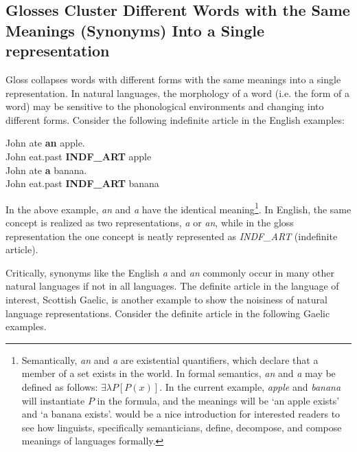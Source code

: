 \documentclass[final]{ua-thesis}
\numberwithin{equation}{section}
\begin{document}
\subsection{Glosses Cluster Different Words with the Same Meanings (Synonyms) Into a Single representation}\label{sec:cluster}
Gloss collapses words with different forms with the same meanings into a single representation. In natural languages, the morphology of a word (i.e. the form of a word) may be sensitive to the phonological environments and changing into different forms. Consider the following indefinite article in the English examples: 

\begin{exe}  
\ex \gll John ate \textbf{an} apple.\\
	John eat.past	\textbf{INDF\_ART} apple\\
\ex \gll John ate \textbf{a} banana.\\
	John eat.past   \textbf{INDF\_ART} banana\\
\end{exe}

In the above example, \textit{an} and \textit{a} have the identical meaning\footnote{Semantically, \textit{an} and \textit{a} are existential quantifiers, which declare that a member of a set exists in the world. In formal semantics, \textit{an} and \textit{a} may be defined as follows: $\exists\lambda P[P(x)]$. In the current example, \textit{apple} and \textit{banana} will instantiate $P$ in the formula, and the meanings will be `an apple exists' and `a banana exists'. \citet{kratzer1998semantics} would be a nice introduction for interested readers to see how linguists, specifically semanticians, define, decompose, and compose meanings of languages formally.}. 
In English, the same concept is realized as two representations, \textit{a} or \textit{an}, while in the gloss representation the one concept is neatly represented as \textit{INDF\_ART} (indefinite article). 

Critically, synonyms like the English \textit{a} and \textit{an} commonly occur in many other natural languages if not in all languages. The definite article in the language of interest, Scottish Gaelic, is another example to show the noisiness of natural language representations. Consider the definite article in the following Gaelic examples. 
\end{document}
